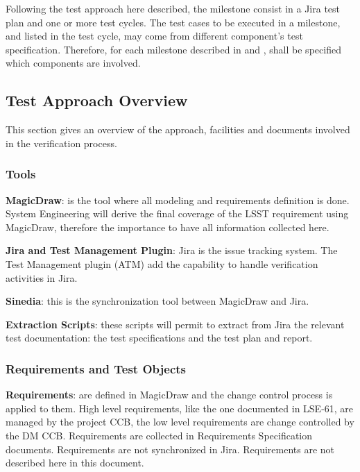 {\footnotesize

}

Following the test approach here described, the milestone consist in a Jira test plan and one or more test cycles.
The test cases to be executed in a milestone, and listed in the test cycle, may come from different component's test specification.
Therefore, for each milestone described in  and , shall be specified which components are involved.

\subsection{Test Approach Overview}\label{sect:tsform}

This section gives an overview of the approach, facilities and documents involved in the verification process.


\subsubsection{Tools}

{\bf MagicDraw}: is the tool where all modeling and requirements definition is done. System Engineering will derive the final coverage of the LSST requirement using MagicDraw, therefore the importance to have all information collected here.

{\bf Jira and Test Management Plugin}: Jira is the issue tracking system. The Test Management plugin (ATM) add the capability to handle verification activities in Jira.

{\bf Sinedia}: this is the synchronization tool between MagicDraw and Jira.

{\bf Extraction Scripts}: these scripts will permit to extract from Jira the relevant test documentation: the test specifications and the test plan and report.


\subsubsection{Requirements and Test Objects}

{\bf Requirements}: are defined in MagicDraw and the change control process is applied to them. High level requirements, like the one documented in LSE-61, are managed by the project CCB, the low level requirements are change controlled by the DM CCB.
Requirements are collected in Requirements Specification documents.
Requirements are not synchronized in Jira.
Requirements are not described here in this document.

